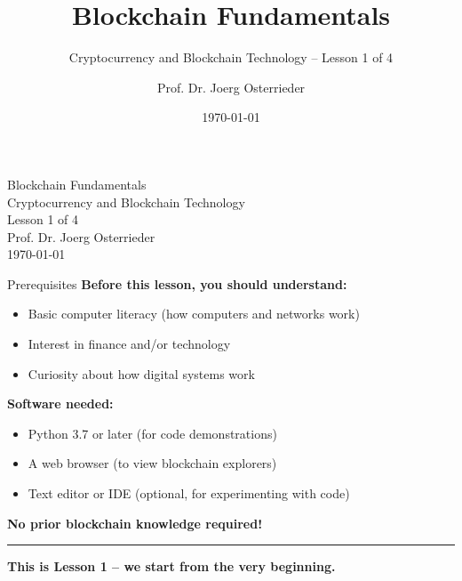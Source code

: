 \documentclass[8pt,aspectratio=169]{beamer}
\title{Blockchain Fundamentals}
\subtitle{Cryptocurrency and Blockchain Technology -- Lesson 1 of 4}
\author{Prof. Dr. Joerg Osterrieder}
\institute{University Lecture Series}
\date{\today}
\newcommand{\bottomnote}[1]{%
\vfill
\vspace{-2mm}
\textcolor{mllavender2}{\rule{\textwidth}{0.4pt}}
\vspace{1mm}
\footnotesize
\textbf{#1}
}
\begin{document}
\begin{frame}[plain]
\vspace{2cm}
\begin{center}
{\Huge Blockchain Fundamentals}\\[0.5cm]
{\Large Cryptocurrency and Blockchain Technology}\\[0.3cm]
{\normalsize Lesson 1 of 4}\\[2cm]
{\normalsize Prof. Dr. Joerg Osterrieder}\\[0.3cm]
{\small \today}
\end{center}
\end{frame}

\begin{frame}{Prerequisites}
\textbf{Before this lesson, you should understand:}
\begin{itemize}
\item Basic computer literacy (how computers and networks work)
\item Interest in finance and/or technology
\item Curiosity about how digital systems work
\end{itemize}

\vspace{1em}
\textbf{Software needed:}
\begin{itemize}
\item Python 3.7 or later (for code demonstrations)
\item A web browser (to view blockchain explorers)
\item Text editor or IDE (optional, for experimenting with code)
\end{itemize}

\vspace{1em}
\textbf{No prior blockchain knowledge required!}

\bottomnote{This is Lesson 1 -- we start from the very beginning.}
\end{frame}
\end{document}
